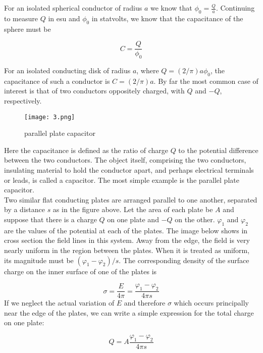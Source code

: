 \documentclass[svgnames]{article}
\begin{document}
For an isolated spherical conductor of radius $a$ we know that $\phi_0
= \frac{Q}{a}$. Continuing to measure $Q$ in esu and $\phi_0$ in statvolts, we
know that the capacitance of the sphere must be \\
\begin{tcolorbox}
\[
C = \frac{Q}{\phi_0}
\] 
\end{tcolorbox}


For an isolated conducting disk of radius $a$, where $Q = (2/\pi)a\phi_0$, the
capacitance of such a conductor is $C = (2/\pi)a$. By far the most common case
of interest is that of two conductors oppositely charged, with $Q$ and $-Q$,
respectively. 

\begin{figure}[hb!]
  \centering
    \texttt{[image: 3.png]}
    \caption{parallel plate capacitor}
\end{figure}

Here the capacitance is defined as the ratio of charge $Q$ to the potential
difference between the two conductors. The object itself, comprising the two
conductors, insulating material to hold the conductor apart, and perhaps
electrical terminals or leads, is called a capacitor. The most simple example
is the parallel plate capacitor. \\
Two similar flat conducting plates are arranged parallel to one another,
separated by a distance $s$ as in the figure above. Let the area of each plate
be $A$ and suppose that there is a charge $Q$ on one plate and $-Q$ on the
other. $\varphi_1$ and $\varphi_2$ are the values of the potential at each of
the plates. The image below shows in cross section the field lines in this
system. Away from the edge, the field is very nearly uniform in the region
between the plates. When it is treated as uniform, its magnitude must be
$(\varphi_1 - \varphi_2)/s$. The corresponding density of the surface charge on
the inner surface of one of the plates is 

\[
  \sigma = \frac{E}{4\pi} = \frac{\varphi_1-\varphi_2}{4\pi s}
\] 
If we neglect the actual variation of $E$ and therefore $\sigma$ which occurs
principally near the edge of the plates, we can write a simple expression for
the total charge on one plate: 

 \[
Q = A\frac{\varphi_1-\varphi_2}{4\pi s}
\] 
\end{document}
